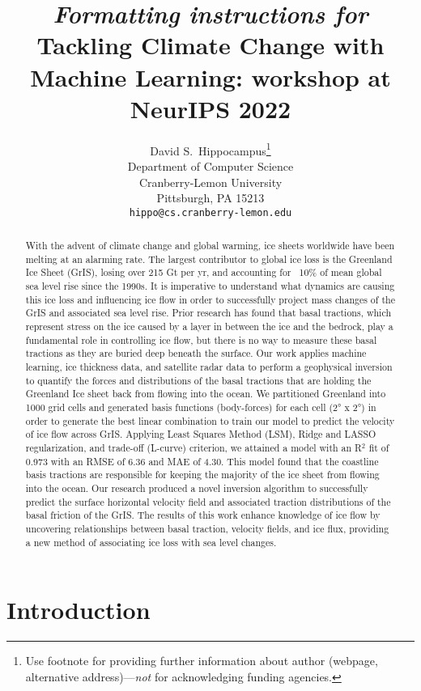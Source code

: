 \documentclass{article}
\title{\textit{Formatting instructions for} Tackling Climate Change with Machine Learning: workshop at NeurIPS 2022}
\author{%
  David S.~Hippocampus\thanks{Use footnote for providing further information
    about author (webpage, alternative address)---\emph{not} for acknowledging
    funding agencies.} \\
  Department of Computer Science\\
  Cranberry-Lemon University\\
  Pittsburgh, PA 15213 \\
  \texttt{hippo@cs.cranberry-lemon.edu} \\
}
\begin{document}
\maketitle

\begin{abstract}
With the advent of climate change and global warming, ice sheets worldwide have been melting at an alarming rate. The largest contributor to global ice loss is the Greenland Ice Sheet (GrIS), losing over 215 Gt per yr, and accounting for ~10\% of mean global sea level rise since the 1990s. It is imperative to understand what dynamics are causing this ice loss and influencing ice flow in order to successfully project mass changes of the GrIS and associated sea level rise. Prior research has found that basal tractions, which represent stress on the ice caused by a layer in between the ice and the bedrock, play a fundamental role in controlling ice flow, but there is no way to measure these basal tractions as they are buried deep beneath the surface. Our work applies machine learning, ice thickness data, and satellite radar data to perform a geophysical inversion to quantify the forces and distributions of the basal tractions that are holding the Greenland Ice sheet back from flowing into the ocean. We partitioned Greenland into 1000 grid cells and generated basis functions (body-forces) for each cell (2° x 2°) in order to generate the best linear combination to train our model to predict the velocity of ice flow across GrIS. Applying Least Squares Method (LSM), Ridge and LASSO regularization, and trade-off (L-curve) criterion, we attained a model with an R$^2$ fit of 0.973 with an RMSE of 6.36 and MAE of 4.30. This model found that the coastline basis tractions are responsible for keeping the majority of the ice sheet from flowing into the ocean. Our research produced a novel inversion algorithm to successfully predict the surface horizontal velocity field and associated traction distributions of the basal friction of the GrIS. The results of this work enhance knowledge of ice flow by uncovering relationships between basal traction, velocity fields, and ice flux, providing a new method of associating ice loss with sea level changes.
\end{abstract}

\section{Introduction}
\end{document}
